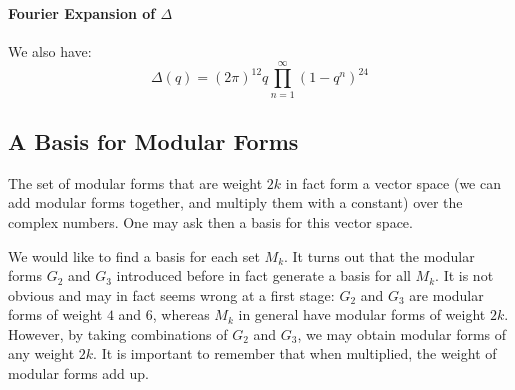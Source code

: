 \paragraph{Fourier Expansion of $\varDelta$}
We also have\cite[p.95]{CourseInArithmetic}:
$$
\varDelta(q) = (2\pi)^{12} q \prod_{n=1}^{\infty} (1-q^n)^{24}
$$



\subsection{A Basis for Modular Forms}
\label{BasisModularForms}
The set of modular forms that are weight $2k$ in fact form a vector space (we can add modular forms together, and multiply them with a constant) over the complex numbers. 
One may ask then a basis for this vector space.

We would like to find a basis for each set $M_k$. It turns out that the modular forms $G_2$ and $G_3$ introduced before in fact generate a basis for all $M_k$. 
It is not obvious and may in fact seems wrong at a first stage: $G_2$ and $G_3$ are modular forms of weight $4$ and $6$, whereas $M_k$ in general have modular forms of weight $2k$.
However, by taking combinations of $G_2$ and $G_3$, we may obtain modular forms of any weight $2k$. It is important to remember that when multiplied, the weight of modular forms add up.

